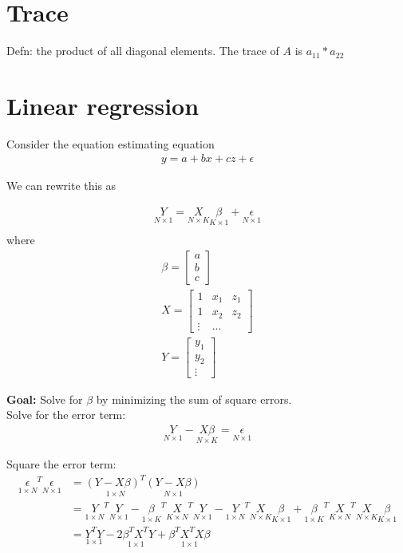 \documentclass{article}
\begin{document}
\section{Trace}
Defn: the product of all diagonal elements. The trace of $A$ is $a_{11} * a_{22}$

\section{Linear regression}
Consider the equation estimating equation 
\begin{align}
    y = a + bx + cz + \epsilon
\end{align}

We can rewrite this as

\begin{align}
    \underset{N \times 1} Y = \underset{N \times K } X 
                              \underset{K \times 1} \beta +  \underset{ N \times 1} \epsilon\\
\end{align} 
where 
\begin{align}
    \beta = \begin{bmatrix}
        a\\
        b\\
        c
    \end{bmatrix}\\
    X = \begin{bmatrix}
        1 & x_1& z_1\\
        1 & x_2 & z_2\\
        \vdots & ...
    \end{bmatrix}\\
    Y = \begin{bmatrix}
        y_1\\
        y_2\\
        \vdots
    \end{bmatrix}
\end{align}

\textbf{Goal:} Solve for $\beta$ by minimizing the sum of square errors. \\

Solve for the error term:
\begin{align}
    \underset{N \times 1} Y - \underset{N \times K}{X \beta} = \underset{N \times 1} \epsilon
\end{align}

Square the error term:
\begin{align}
    \underset{1 \times N} \epsilon^T  \underset{N \times 1}\epsilon &= 
        \underset{1 \times N}{(Y - X \beta)^T} \underset{N \times 1}{(Y - X \beta)} \\
    &= \underset{1 \times N}Y^T \underset{N \times 1} Y - \underset{1 \times K} \beta^T \underset{K \times N} X^T \underset{N \times 1} Y - \underset{1 \times N} Y^T \underset{N \times K} X \underset{K \times 1}\beta + \underset{1 \times K}\beta^T \underset{K \times N}X^T \underset{N \times K}X \underset{K \times 1}\beta\\
    &= \underset{1 \times 1}{Y^T Y} - \underset{1 \times 1}{2 \beta^T X^T Y} + \underset{1 \times 1}{\beta^T X^T X \beta}
\end{align}
\end{document}

